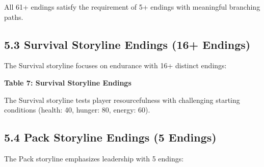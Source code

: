 \documentclass[12pt,a4paper]{article}
\begin{document}
All 61+ endings satisfy the requirement of 5+ endings with meaningful branching paths.

\subsection{5.3 Survival Storyline Endings (16+ Endings)}
The Survival storyline focuses on endurance with 16+ distinct endings:

\textbf{Table 7: Survival Storyline Endings}
\begin{center}
\end{center}

\vspace{0.3cm}

The Survival storyline tests player resourcefulness with challenging starting conditions (health: 40, hunger: 80, energy: 60).

\subsection{5.4 Pack Storyline Endings (5 Endings)}
The Pack storyline emphasizes leadership with 5 endings:
\end{document}
